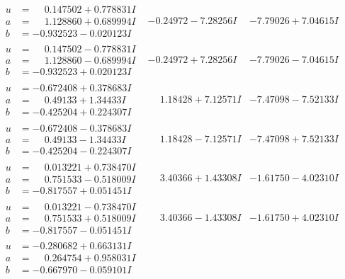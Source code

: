 \documentclass[1p]{elsarticle_modified}
\theoremstyle{definition}
\begin{document}
$$\begin{array}{c|c|c}
\begin{aligned}
u &= \phantom{-}0.147502 + 0.778831 I \\
a &= \phantom{-}1.128860 + 0.689994 I \\
b &= -0.932523 - 0.020123 I\end{aligned}
 & -0.24972 - 7.28256 I & -7.79026 + 7.04615 I \\ \hline\begin{aligned}
u &= \phantom{-}0.147502 - 0.778831 I \\
a &= \phantom{-}1.128860 - 0.689994 I \\
b &= -0.932523 + 0.020123 I\end{aligned}
 & -0.24972 + 7.28256 I & -7.79026 - 7.04615 I \\ \hline\begin{aligned}
u &= -0.672408 + 0.378683 I \\
a &= \phantom{-}0.49133 + 1.34433 I \\
b &= -0.425204 + 0.224307 I\end{aligned}
 & \phantom{-}1.18428 + 7.12571 I & -7.47098 - 7.52133 I \\ \hline\begin{aligned}
u &= -0.672408 - 0.378683 I \\
a &= \phantom{-}0.49133 - 1.34433 I \\
b &= -0.425204 - 0.224307 I\end{aligned}
 & \phantom{-}1.18428 - 7.12571 I & -7.47098 + 7.52133 I \\ \hline\begin{aligned}
u &= \phantom{-}0.013221 + 0.738470 I \\
a &= \phantom{-}0.751533 - 0.518009 I \\
b &= -0.817557 + 0.051451 I\end{aligned}
 & \phantom{-}3.40366 + 1.43308 I & -1.61750 - 4.02310 I \\ \hline\begin{aligned}
u &= \phantom{-}0.013221 - 0.738470 I \\
a &= \phantom{-}0.751533 + 0.518009 I \\
b &= -0.817557 - 0.051451 I\end{aligned}
 & \phantom{-}3.40366 - 1.43308 I & -1.61750 + 4.02310 I \\ \hline\begin{aligned}
u &= -0.280682 + 0.663131 I \\
a &= \phantom{-}0.264754 + 0.958031 I \\
b &= -0.667970 - 0.059101 I\end{aligned}

\end{array}$$
\end{document}
